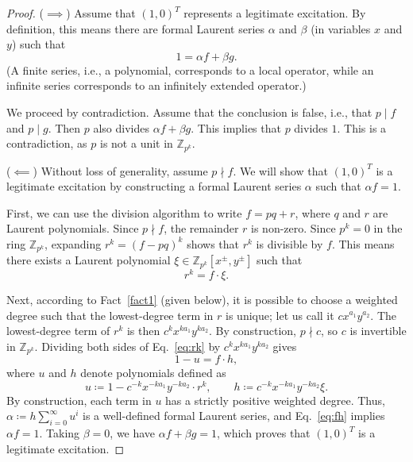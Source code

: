 \documentclass[aps,prb,english,superscriptaddress,twocolumn,tightenlines,showpacs,longbibliography,floatfix,amsfonts]{revtex4-2}
\begin{document}
\begin{proof}
($\implies$) Assume that $\left(1,0\right)^{T}$ represents a legitimate
excitation. By definition, this means there are formal Laurent series $\alpha$ and $\beta$ (in variables $x$ and $y$) such that
\begin{equation}
1=\alpha f+\beta g.
\end{equation}
(A finite series, i.e., a polynomial, corresponds to a local operator, while an infinite series corresponds to an infinitely extended operator.) 

We proceed by contradiction. Assume that the conclusion is false, i.e.,
that $p\mid f$ and $p\mid g$. Then $p$  also divides $\alpha f+\beta g$.
This implies that $p$ divides $1$. This is a contradiction, as $p$ is not a unit in $\mathbb{Z}_{p^k}$.

($\impliedby$) Without loss of generality, assume $p\nmid f$. We
will show that $\left(1,0\right)^{T}$ is a legitimate excitation
by constructing a formal Laurent series $\alpha$ such that $\alpha f=1$.

First, we can use the division algorithm to write $f=pq+r$, where
$q$ and $r$ are Laurent polynomials. Since $p\nmid f$, the remainder
$r$ is non-zero. Since $p^{k}=0$ in the ring $\mathbb{Z}_{p^{k}}$,
expanding $r^{k}=\left(f-pq\right)^{k}$ shows that $r^{k}$ is divisible
by $f$. This means there exists a Laurent polynomial $\xi\in\mathbb{Z}_{p^{k}}\left[x^{\pm},y^{\pm}\right]$
such that 
\begin{equation}
r^{k}=f\cdot\xi.\label{eq:rk}
\end{equation}

Next, according to Fact~\ref{fact1} (given below), it is possible to choose a weighted
degree such that the lowest-degree term in $r$ is unique; let us
call it $cx^{a_{1}}y^{a_{2}}$. The lowest-degree term of $r^{k}$
is then $c^{k}x^{ka_{1}}y^{ka_{2}}$. By construction, $p\nmid c$,
so $c$ is invertible in $\mathbb{Z}_{p^{k}}$. 
Dividing both sides of Eq.~\eqref{eq:rk} by $c^{k}x^{ka_{1}}y^{ka_{2}}$ gives
\begin{equation}
1-u=f\cdot h, \label{eq:fh}
\end{equation}
where $u$ and $h$ denote polynomials defined as
\begin{equation}
u\coloneqq1-c^{-k}x^{-ka_{1}}y^{-ka_{2}}\cdot r^{k},\qquad h\coloneqq c^{-k}x^{-ka_{1}}y^{-ka_{2}}\xi.
\end{equation}
By construction, each term in $u$ has a strictly positive weighted
degree. Thus, 
$
\alpha\coloneqq h\sum_{i=0}^{\infty}u^{i}    
$
is a well-defined formal Laurent series, and Eq.~\eqref{eq:fh} implies $\alpha f=1$. Taking $\beta=0$, we have $\alpha f+\beta g=1$, which proves that $\left(1,0\right)^{T}$
is a legitimate excitation.
\end{proof}
\end{document}
